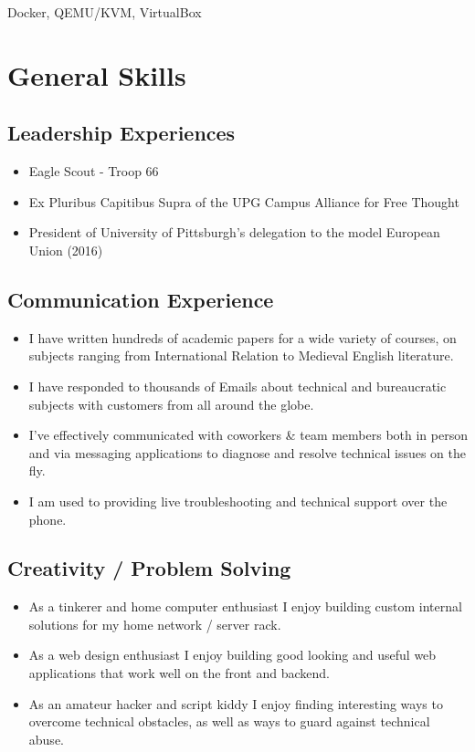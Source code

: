 \documentclass{article}
\begin{document}
Docker, QEMU/KVM, VirtualBox

\section{General Skills}

\subsection{Leadership Experiences}

\begin{itemize}
\item Eagle Scout - Troop 66

\item Ex Pluribus Capitibus Supra of the UPG Campus Alliance for Free Thought

\item President of University of Pittsburgh's delegation to the model European Union (2016)
\end{itemize}

\subsection{Communication Experience}

\begin{itemize}
\item I have written hundreds of academic papers for a wide variety of courses, on
subjects ranging from International Relation to Medieval English literature.

\item I have responded to thousands of Emails about technical and bureaucratic
subjects with customers from all around the globe.

\item I've effectively communicated with coworkers \& team members both in person and
via messaging applications to diagnose and resolve technical issues on the fly.

\item I am used to providing live troubleshooting and technical support over the
phone. 
\end{itemize}

\subsection{Creativity / Problem Solving}

\begin{itemize}
\item As a tinkerer and home computer enthusiast I enjoy building custom internal
solutions for my home network / server rack.

\item As a web design enthusiast I enjoy building good looking and useful web
applications that work well on the front and backend.

\item As an amateur hacker and script kiddy I enjoy finding interesting ways to
overcome technical obstacles, as well as ways to guard against technical abuse.
\end{itemize}
\end{document}
